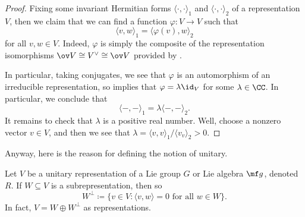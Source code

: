 \documentclass[../notes.tex]{subfiles}
\begin{document}
\begin{proof}
	Fixing some invariant Hermitian forms $\langle\cdot,\cdot\rangle_1$ and $\langle\cdot,\cdot\rangle_2$ of a representation $V$, then we claim that we can find a function $\varphi\colon V\to V$ such that
	\[\langle v,w\rangle_1=\langle\varphi(v),w\rangle_2\]
	for all $v,w\in V$. Indeed, $\varphi$ is simply the composite of the representation isomorphisms $\ov V\cong V^\lor\cong\ov V$ provided by .

	In particular, taking conjugates, we see that $\varphi$ is an automorphism of an irreducible representation, so  implies that $\varphi=\lambda\id_V$ for some $\lambda\in\CC$. In particular, we conclude that
	\[\langle-,-\rangle_1=\lambda\langle-,-\rangle_2.\]
	It remains to check that $\lambda$ is a positive real number. Well, choose a nonzero vector $v\in V$, and then we see that $\lambda=\langle v,v\rangle_1/\langle v_v\rangle_2>0$.
\end{proof}
Anyway, here is the reason for defining the notion of unitary.
\begin{proposition} \label{prop:unitary-complement}
	Let $V$ be a unitary representation of a Lie group $G$ or Lie algebra $\mf g$, denoted $R$. If $W\subseteq V$ is a subrepresentation, then so
	\[W^\perp\coloneqq\{v\in V:\langle v,w\rangle=0\text{ for all }w\in W\}.\]
	In fact, $V=W\oplus W^\perp$ as representations.
\end{proposition}
\end{document}
